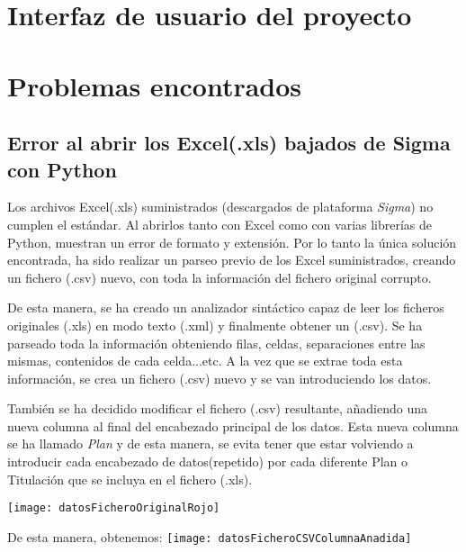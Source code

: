 \section{Interfaz de usuario del proyecto}\label{interfaz_de_usuario_del_proyecto}




\section{Problemas encontrados}

\subsection{Error al abrir los Excel(.xls) bajados de Sigma con Python}
Los archivos Excel(.xls) suministrados (descargados de plataforma \emph{Sigma}) no cumplen el estándar. Al abrirlos tanto con Excel como con varias librerías de Python, muestran un error de formato y extensión. Por lo tanto la única solución encontrada, ha sido realizar un parseo previo de los Excel suministrados, creando un fichero (.csv) nuevo, con toda la información del fichero original corrupto.

De esta manera, se ha creado un analizador sintáctico capaz de leer los ficheros originales (.xls) en modo texto (.xml) y finalmente obtener un (.csv). Se ha parseado toda la información obteniendo filas, celdas, separaciones entre las mismas, contenidos de cada celda...etc. A la vez que se extrae toda esta información, se crea un fichero (.csv) nuevo y se van introduciendo los datos.

También se ha decidido modificar el fichero (.csv) resultante, añadiendo una nueva columna al final del encabezado principal de los datos. Esta nueva columna se ha llamado \emph{Plan} y de esta manera, se evita tener que estar volviendo a introducir cada encabezado de datos(repetido) por cada diferente Plan o Titulación que se incluya en el fichero (.xls).


\texttt{[image: datosFicheroOriginalRojo]}

De esta manera, obtenemos:
\texttt{[image: datosFicheroCSVColumnaAnadida]}







  

